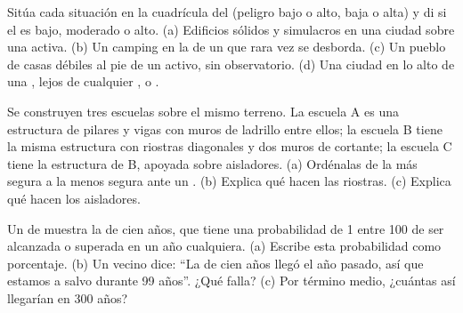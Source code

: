 \begin{exercise}[$\star\star$]\label{exo:g9:natural-risks:7}
Sitúa cada situación en la cuadrícula del  (peligro bajo o alto,
 baja o alta) y di si el  es bajo, moderado o alto.
(a) Edificios sólidos y simulacros en una ciudad sobre una  activa.
(b) Un camping en la  de un  que rara vez se
desborda. (c) Un pueblo de casas débiles al pie de un  activo, sin
observatorio. (d) Una ciudad en lo alto de una , lejos de cualquier
,  o .
\end{exercise}

\begin{exercise}[$\star\star$]\label{exo:g9:natural-risks:8}
Se construyen tres escuelas sobre el mismo terreno. La escuela A es una
estructura de pilares y vigas con muros de ladrillo entre ellos; la
escuela B tiene la misma estructura con riostras diagonales y dos muros de
cortante; la escuela C tiene la estructura de B, apoyada sobre aisladores.
(a) Ordénalas de la más segura a la menos segura ante un .
(b) Explica qué hacen las riostras. (c) Explica qué hacen los aisladores.
\end{exercise}

\begin{exercise}[$\star\star$]\label{exo:g9:natural-risks:9}
Un  de  muestra la  de cien años, que tiene una
probabilidad de 1 entre 100 de ser alcanzada o superada en un año
cualquiera. (a) Escribe esta probabilidad como porcentaje. (b) Un vecino
dice: ``La  de cien años llegó el año pasado, así que estamos a
salvo durante 99 años''. ¿Qué falla? (c) Por término medio, ¿cuántas
 así llegarían en 300 años?
\end{exercise}


